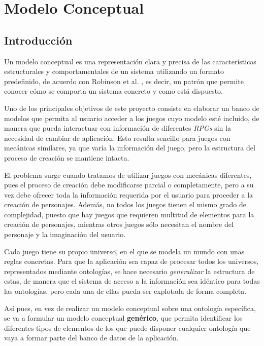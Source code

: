 
\section{Modelo Conceptual}
\subsection{Introducción}
Un modelo conceptual es una representación clara y precisa de las características estructurales y comportamentales de un sistema 
utilizando un formato predefinido, de acuerdo con Robinson et al. \autocite*{Robinson2016}, es decir, un patrón que permite 
conocer cómo se comporta un sistema concreto y como está dispuesto. \medskip

Uno de los principales objetivos de este proyecto consiste en elaborar un banco de modelos que permita al usuario 
acceder a los juegos cuyo modelo esté incluido, de manera que pueda interactuar con información de diferentes \textit{RPGs} 
sin la necesidad de cambiar de aplicación. Esto resulta sencillo para juegos con mecánicas similares, ya que varía la información
del juego, pero la estructura del proceso de creación se mantiene intacta.\medskip 

El problema surge cuando tratamos de utilizar juegos con mecánicas diferentes, pues el proceso de creación debe 
modificarse parcial o completamente, pero a su vez debe ofrecer toda la información requerida por el usuario para 
proceder a la creación de personajes. Además, no todos los juegos tienen el mismo grado de complejidad, puesto que 
hay juegos que requieren multitud de elementos para la creación de personajes, mientras otros juegos sólo necesitan 
el nombre del personaje y la imaginación del usuario. \medskip

Cada juego tiene su propio \"universo\", en el que se modela un mundo con unas reglas concretas. Para que la aplicación sea 
capaz de procesar todos los universos, representados mediante ontologías, se hace necesario \textit{generalizar} la 
estructura de estas, de manera que el sistema de acceso a la información sea idéntico para todas las ontologías, pero 
cada una de ellas pueda ser explotada de forma completa. \medskip

Así pues, en vez de realizar un modelo conceptual sobre una ontología específica, se va a formular un modelo 
conceptual \textbf{genérico}, que permita identificar los diferentes tipos de elementos de los que puede disponer 
cualquier ontología que vaya a formar parte del banco de datos de la aplicación. \medskip 

